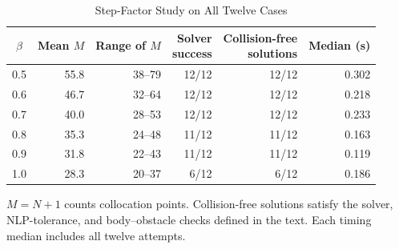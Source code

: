 \begin{table}[t]
\caption{Step-Factor Study on All Twelve Cases}\label{tab:beta}
\centering\footnotesize
\begin{tabular}{@{}crrrrr@{}}\toprule
$\beta$&Mean $M$&Range of $M$&\shortstack{Solver\\success}&\shortstack{Collision-free\\solutions}&Median (s)\\\midrule
0.5&55.8&38--79&12/12&12/12&0.302\\
0.6&46.7&32--64&12/12&12/12&0.218\\
0.7&40.0&28--53&12/12&12/12&0.233\\
0.8&35.3&24--48&11/12&11/12&0.163\\
0.9&31.8&22--43&11/12&11/12&0.119\\
1.0&28.3&20--37&6/12&6/12&0.186\\
\bottomrule\end{tabular}
\par\smallskip\parbox{\columnwidth}{\footnotesize $M=N+1$ counts collocation points. Collision-free solutions satisfy the solver, NLP-tolerance, and body--obstacle checks defined in the text. Each timing median includes all twelve attempts.}
\end{table}
